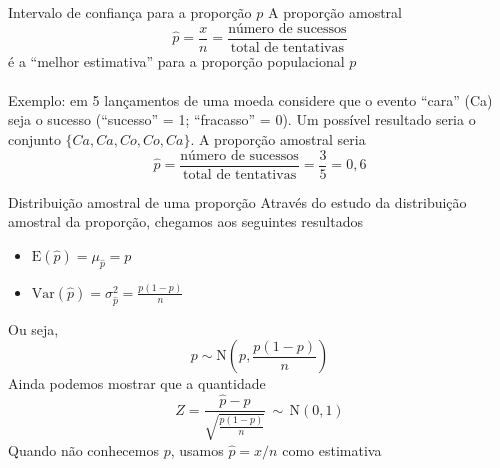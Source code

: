 \documentclass[10pt]{beamer}\usepackage[]{graphicx}\usepackage[]{color}
\providecommand{\E}{\text{E}}
\providecommand{\Var}{\text{Var}}
\providecommand{\N}{\text{N}}
\theoremstyle{definition}
\begin{document}
\begin{frame}{Intervalo de confiança para a proporção $p$}
  A proporção amostral
  \begin{equation*}
    \hat{p} = \frac{x}{n} = \frac{\text{número de sucessos}}{\text{total de
        tentativas}}
  \end{equation*}
  é a ``melhor estimativa'' para a proporção populacional $p$ \\~\\
  Exemplo: em 5 lançamentos de uma moeda considere que o evento ``cara''
  (Ca) seja o sucesso (``sucesso'' = 1; ``fracasso'' = 0). Um possível
  resultado seria o conjunto $\{Ca, Ca, Co, Co, Ca\}$. A proporção
  amostral seria
  \begin{equation*}
    \hat{p} = \frac{\text{número de sucessos}}{\text{total de
        tentativas}} = \frac{3}{5} = 0,6
  \end{equation*}
\end{frame}

\begin{frame}{Distribuição amostral de uma proporção}
Através do estudo da distribuição amostral da proporção, chegamos aos
seguintes resultados
\begin{itemize}
\item $\E(\hat{p}) = \mu_{\hat{p}} = p$
\item $\Var(\hat{p}) = \sigma^{2}_{\hat{p}} = \frac{p(1-p)}{n}$
\end{itemize}
Ou seja,
\begin{equation*}
  p \sim \N \left( p, \frac{p(1-p)}{n} \right)
\end{equation*}
Ainda podemos mostrar que a quantidade
\begin{equation*}
  Z = \frac{\hat{p} - p}{\sqrt{\frac{p(1-p)}{n}}} \, \sim \, \N(0,1)
\end{equation*}
Quando não conhecemos $p$, usamos $\hat{p}=x/n$ como estimativa
\end{frame}
\end{document}

